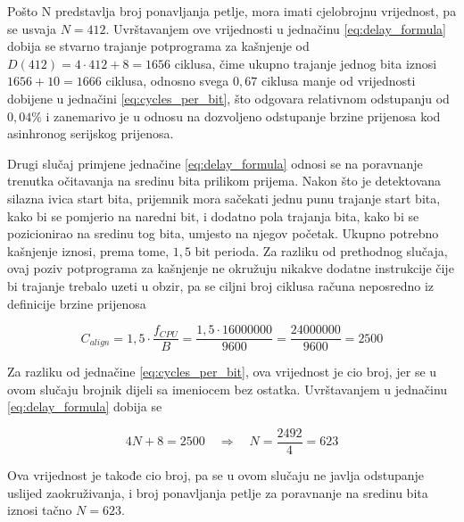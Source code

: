 Pošto N predstavlja broj ponavljanja petlje, mora imati cjelobrojnu
vrijednost, pa se usvaja $N = 412$. Uvrštavanjem ove vrijednosti u
jednačinu \ref{eq:delay_formula} dobija se stvarno trajanje potprograma
za kašnjenje od $D(412) = 4 \cdot 412 + 8 = 1656$ ciklusa, čime ukupno
trajanje jednog bita iznosi $1656 + 10 = 1666$ ciklusa, odnosno svega
$0{,}67$ ciklusa manje od vrijednosti dobijene u jednačini
\ref{eq:cycles_per_bit}, što odgovara relativnom odstupanju od
$0{,}04\%$ i zanemarivo je u odnosu na dozvoljeno odstupanje brzine
prijenosa kod asinhronog serijskog prijenosa.

Drugi slučaj primjene jednačine \ref{eq:delay_formula} odnosi se na
poravnanje trenutka očitavanja na sredinu bita prilikom prijema. Nakon
što je detektovana silazna ivica start bita, prijemnik mora sačekati
jednu punu trajanje start bita, kako bi se pomjerio na naredni bit, i
dodatno pola trajanja bita, kako bi se pozicionirao na sredinu tog bita,
umjesto na njegov početak. Ukupno potrebno kašnjenje iznosi, prema tome,
$1{,}5$ bit perioda. Za razliku od prethodnog slučaja, ovaj poziv
potprograma za kašnjenje ne okružuju nikakve dodatne instrukcije čije bi
trajanje trebalo uzeti u obzir, pa se ciljni broj ciklusa računa
neposredno iz definicije brzine prijenosa

\begin{equation}
    C_{align} = 1{,}5 \cdot \frac{f_{CPU}}{B} = \frac{1{,}5 \cdot 16000000}{9600} = \frac{24000000}{9600} = 2500
\end{equation}

Za razliku od jednačine \ref{eq:cycles_per_bit}, ova vrijednost je cio
broj, jer se u ovom slučaju brojnik dijeli sa imeniocem bez ostatka.
Uvrštavanjem u jednačinu \ref{eq:delay_formula} dobija se

\begin{equation}
    4N + 8 = 2500 \quad \Rightarrow \quad N = \frac{2492}{4} = 623
\end{equation}

Ova vrijednost je takođe cio broj, pa se u ovom slučaju ne javlja
odstupanje uslijed zaokruživanja, i broj ponavljanja petlje za poravnanje
na sredinu bita iznosi tačno $N = 623$.
%
